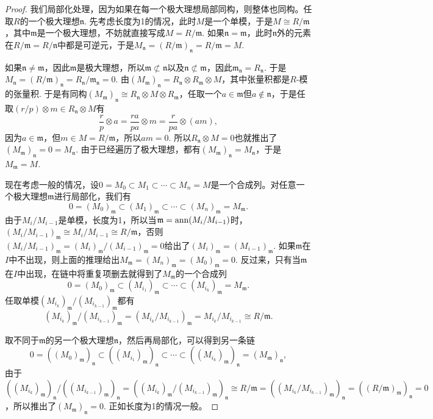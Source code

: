 \begin{proof}
	我们局部化处理，因为如果在每一个极大理想局部同构，则整体也同构。任取$R$的一个极大理想$\mathfrak{n}$. 先考虑长度为1的情况，此时$M$是一个单模，于是$M\cong R/\mathfrak{m}$，其中$\mathfrak{m}$是一个极大理想，不妨就直接写成$M=R/\mathfrak{m}$. 如果$\mathfrak{n}=\mathfrak{m}$，此时$\mathfrak{n}$外的元素在$R/\mathfrak{m}=R/\mathfrak{n}$中都是可逆元，于是$M_{\mathfrak{n}}=(R/\mathfrak{m})_{\mathfrak{n}}=R/\mathfrak{m}=M$. 

	如果$\mathfrak{n}\neq \mathfrak{m}$，因此$\mathfrak{m}$是极大理想，所以$\mathfrak{m}\not\subset \mathfrak{n}$以及$\mathfrak{n}\not\subset \mathfrak{m}$，因此$\mathfrak{m}_\mathfrak{n}=R_\mathfrak{n}$. 于是$M_\mathfrak{n}=(R/\mathfrak{m})_\mathfrak{n}=R_\mathfrak{n}/\mathfrak{m}_\mathfrak{n}=0$. 由$(M_\mathfrak{m})_\mathfrak{n}=R_\mathfrak{n}\otimes R_\mathfrak{m} \otimes M$，其中张量积都是$R$-模的张量积. 于是有同构$(M_\mathfrak{m})_\mathfrak{n}\cong R_\mathfrak{n}\otimes M\otimes R_\mathfrak{m}$，任取一个$a\in \mathfrak{m}$但$a\not\in \mathfrak{n}$，于是任取$(r/p)\otimes m \in R_\mathfrak{n}\otimes M$有
	\[
		\frac{r}{p}\otimes a=\frac{ra}{pa}\otimes m =\frac{r}{pa}\otimes (am),
	\]
	因为$a\in \mathfrak{m}$，但$m\in M=R/\mathfrak{m}$，所以$am=0$. 所以$R_\mathfrak{n}\otimes M=0$也就推出了$(M_\mathfrak{m})_\mathfrak{n}=0=M_\mathfrak{n}$. 由于已经遍历了极大理想，都有$(M_\mathfrak{m})_\mathfrak{n}=M_\mathfrak{n}$，于是$M_\mathfrak{m}=M$.

	现在考虑一般的情况，设$0=M_0\subset M_1\subset \cdots\subset M_n=M$是一个合成列。对任意一个极大理想$\mathfrak{m}$进行局部化，我们有
	\[
	0=(M_0)_\mathfrak{m}\subset (M_1)_\mathfrak{m}\subset \cdots\subset (M_n)_\mathfrak{m}=M_\mathfrak{m}.
	\]
	由于$M_i/M_{i-1}$是单模，长度为1，所以当$\mathfrak{m}=\operatorname{ann}(M_i/M_{i-1})$时，$(M_i/M_{i-1})_\mathfrak{m}\cong M_i/M_{i-1}\cong R/\mathfrak{m}$，否则$(M_i/M_{i-1})_{\mathfrak{m}}=(M_i)_{\mathfrak{m}}/(M_{i-1})_{\mathfrak{m}}=0$给出了$(M_i)_{\mathfrak{m}}=(M_{i-1})_{\mathfrak{m}}$. 如果$\mathfrak{m}$在$I$中不出现，则上面的推理给出$M_\mathfrak{m}=(M_n)_\mathfrak{m}=(M_0)_\mathfrak{m}=0$. 反过来，只有当$\mathfrak{m}$在$I$中出现，在链中将重复项删去就得到了$M_\mathfrak{m}$的一个合成列
	\[
	0=(M_0)_\mathfrak{m}\subset (M_{i_1})_\mathfrak{m}\subset \cdots\subset (M_{i_k})_\mathfrak{m}=M_\mathfrak{m}.
	\]
	任取单模$(M_{i_k})_\mathfrak{m}/(M_{i_{k-1}})_\mathfrak{m}$都有
	\[
	(M_{i_k})_\mathfrak{m}/(M_{i_{k-1}})_\mathfrak{m}=(M_{i_k}/M_{i_{k-1}})_\mathfrak{m}=M_{i_k}/M_{i_{k-1}}\cong R/\mathfrak{m}.
	\]

	取不同于$\mathfrak{m}$的另一个极大理想$\mathfrak{n}$，然后再局部化，可以得到另一条链
	\[
	0=((M_0)_\mathfrak{m})_\mathfrak{n}\subset ((M_{i_1})_\mathfrak{m})_\mathfrak{n}\subset \cdots\subset ((M_{i_k})_\mathfrak{m})_\mathfrak{n}=(M_\mathfrak{m})_\mathfrak{n},
	\]
	由于$((M_{i_k})_\mathfrak{m})_\mathfrak{n}/((M_{i_{k-1}})_\mathfrak{m})_\mathfrak{n}=((M_{i_k})_\mathfrak{m}/(M_{i_{k-1}})_\mathfrak{m})_{\mathfrak{n}}\cong R/\mathfrak{m}=((M_{i_k}/M_{i_{k-1}})_\mathfrak{m})_\mathfrak{n}=((R/\mathfrak{m})_{\mathfrak{m}})_\mathfrak{n}=0$，所以推出了$(M_\mathfrak{m})_\mathfrak{n}=0$. 正如长度为1的情况一般。


\end{proof}
